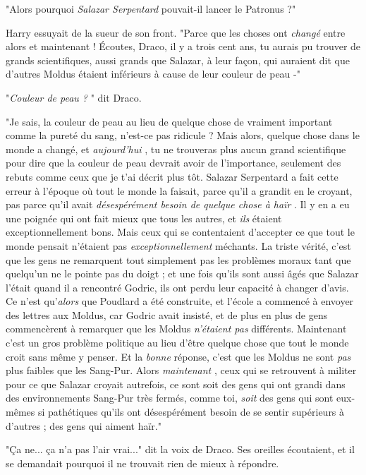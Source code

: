 "Alors pourquoi \emph{Salazar Serpentard}  pouvait-il lancer le Patronus ?"

Harry essuyait de la sueur de son front. "Parce que les choses ont \emph{changé}  entre alors et maintenant ! Écoutes, Draco, il y a trois cent ans, tu aurais pu trouver de grands scientifiques, aussi grands que Salazar, à leur façon, qui auraient dit que d'autres Moldus étaient inférieurs à cause de leur couleur de peau -"

"\emph{Couleur de peau ?} " dit Draco.

"Je sais, la couleur de peau au lieu de quelque chose de vraiment important comme la pureté du sang, n'est-ce pas ridicule ? Mais alors, quelque chose dans le monde a changé, et \emph{aujourd'hui} , tu ne trouveras plus aucun grand scientifique pour dire que la couleur de peau devrait avoir de l'importance, seulement des rebuts comme ceux que je t'ai décrit plus tôt. Salazar Serpentard a fait cette erreur à l'époque où tout le monde la faisait, parce qu'il a grandit en le croyant, pas parce qu'il avait \emph{désespérément besoin de quelque chose à haïr} . Il y en a eu une poignée qui ont fait mieux que tous les autres, et \emph{ils}  étaient exceptionnellement bons. Mais ceux qui se contentaient d'accepter ce que tout le monde pensait n'étaient pas \emph{exceptionnellement}  méchants. La triste vérité, c'est que les gens ne remarquent tout simplement pas les problèmes moraux tant que quelqu'un ne le pointe pas du doigt ; et une fois qu'ils sont aussi âgés que Salazar l'était quand il a rencontré Godric, ils ont perdu leur capacité à changer d'avis. Ce n'est qu'\emph{alors}  que Poudlard a été construite, et l'école a commencé à envoyer des lettres aux Moldus, car Godric avait insisté, et de plus en plus de gens commencèrent à remarquer que les Moldus \emph{n'étaient pas}  différents. Maintenant c'est un gros problème politique au lieu d'être quelque chose que tout le monde croit sans même y penser. Et la \emph{bonne}  réponse, c'est que les Moldus ne sont \emph{pas}  plus faibles que les Sang-Pur. Alors \emph{maintenant} , ceux qui se retrouvent à militer pour ce que Salazar croyait autrefois, ce sont soit des gens qui ont grandi dans des environnements Sang-Pur très fermés, comme toi, \emph{soit}  des gens qui sont eux-mêmes si pathétiques qu'ils ont désespérément besoin de se sentir supérieurs à d'autres ; des gens qui aiment haïr."

"Ça ne... ça n'a pas l'air vrai..." dit la voix de Draco. Ses oreilles écoutaient, et il se demandait pourquoi il ne trouvait rien de mieux à répondre.

